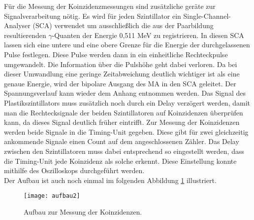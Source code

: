 Für die Messung der Koinzidenzmessungen sind  zusätzliche geräte zur Signalverarbeitung nötig. Es wird für jeden Szintillator ein Single-Channel-Analyser (SCA) verwendet um ausschließlich die aus der Paarbildung resultierenden $\gamma$-Quanten der Energie 0,511 MeV zu registrieren. In diesen SCA lassen sich eine untere und eine obere Grenze für die Energie der durchgelassenen Pulse festlegen. Diese Pulse werden dann in ein einheitliche Rechteckpulse umgewandelt. Die Information über die Pulshöhe geht dabei verloren. Da bei dieser Umwandlung eine geringe Zeitabweichung deutlich wichtiger ist als eine genaue Energie, wird der bipolare Ausgang des MA in den SCA geleitet. Der Spannungsverlauf kann wieder dem Anhang entnommen werden. Das Signal des Plastikszintillators muss zusätzlich noch durch ein Delay verzögert werden, damit man die Rechtecksignale der beiden Szintillatoren auf Koinzidenzen überprüfen kann, da dieses Signal deutlich früher eintrifft. Zur Messung der Koinzidenzen werden beide Signale in die Timing-Unit gegeben. Diese gibt für zwei gleichzeitig ankommende Signale einen Count auf dem angeschlossenen Zähler. Das Delay zwischen den Szintillatoren muss dabei entsprechend so eingestellt werden, dass die Timing-Unit jede Koinzidenz als solche erkennt. Diese Einstellung konnte mithilfe des Oszilloskops durchgeführt werden.\\
Der Aufbau ist auch noch einmal im folgenden Abbildung \ref{fig:aufbau2} illustriert.
\begin{figure}[h]
\begin{center}
\texttt{[image: aufbau2]}
\caption{Aufbau zur Messung der Koinzidenzen.}
\label{fig:aufbau2}
\end{center}
\end{figure}